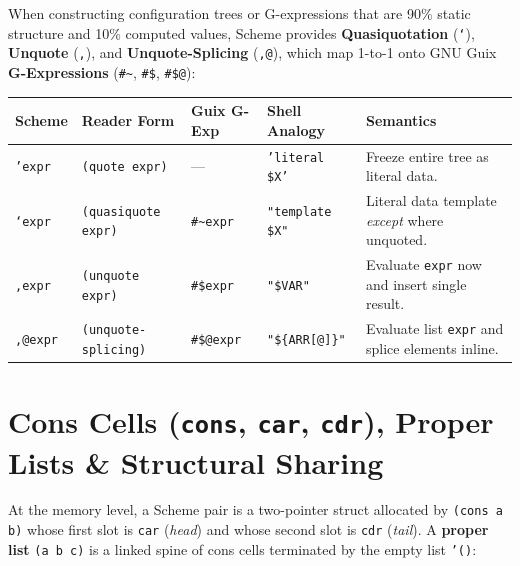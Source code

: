 \documentclass[11pt,oneside]{book}
\begin{document}
When constructing configuration trees or G-expressions that are 90\% static structure and 10\% computed values, Scheme provides \textbf{Quasiquotation} (\texttt{`}), \textbf{Unquote} (\texttt{,}), and \textbf{Unquote-Splicing} (\texttt{,@}), which map 1-to-1 onto GNU Guix \textbf{G-Expressions} (\texttt{\#\textasciitilde}, \texttt{\#\$}, \texttt{\#\$@}):

\begin{center}
\begin{tabularx}{\textwidth}{llllX}
\toprule
\textbf{Scheme} & \textbf{Reader Form} & \textbf{Guix G-Exp} & \textbf{Shell Analogy} & \textbf{Semantics} \\
\midrule
\texttt{'expr} & \texttt{(quote expr)} & --- & \texttt{'literal \$X'} & Freeze entire tree as literal data. \\
\texttt{`expr} & \texttt{(quasiquote expr)} & \texttt{\#\textasciitilde expr} & \texttt{"template \$X"} & Literal data template \emph{except} where unquoted. \\
\texttt{,expr} & \texttt{(unquote expr)} & \texttt{\#\$expr} & \texttt{"\$VAR"} & Evaluate \texttt{expr} now and insert single result. \\
\texttt{,@expr} & \texttt{(unquote-splicing)} & \texttt{\#\$@expr} & \texttt{"\$\{ARR[@]\}"} & Evaluate list \texttt{expr} and splice elements inline. \\
\bottomrule
\end{tabularx}
\end{center}

\section{Cons Cells (\texttt{cons}, \texttt{car}, \texttt{cdr}), Proper Lists \& Structural Sharing}

At the memory level, a Scheme pair is a two-pointer struct allocated by \texttt{(cons a b)} whose first slot is \texttt{car} (\emph{head}) and whose second slot is \texttt{cdr} (\emph{tail}). A \textbf{proper list} \texttt{(a b c)} is a linked spine of cons cells terminated by the empty list \texttt{'()}:
\end{document}
